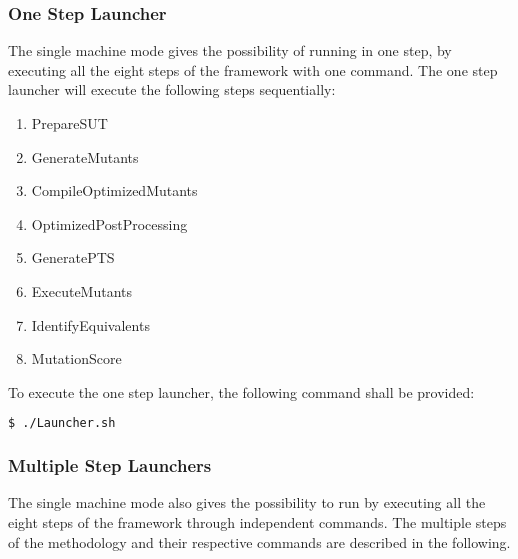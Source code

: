 \subsubsection{One Step Launcher}

The single machine mode gives the possibility of running \MASS in one step, by executing all the eight steps of the framework with one command. The one step launcher will execute the following steps sequentially:

\begin{enumerate}
	\item PrepareSUT
	\item GenerateMutants
	\item CompileOptimizedMutants
	\item OptimizedPostProcessing
	\item GeneratePTS
	\item ExecuteMutants
	\item IdentifyEquivalents
	\item MutationScore
\end{enumerate}

To execute the one step launcher, the following command shall be provided:

\begin{lstlisting}[language=bash]
  $ ./Launcher.sh
\end{lstlisting}

\subsubsection{Multiple Step Launchers}

The single machine mode also gives the possibility to run \MASS by executing all the eight steps of the framework through independent commands.
The multiple steps of the methodology and their respective commands are described in the following.

